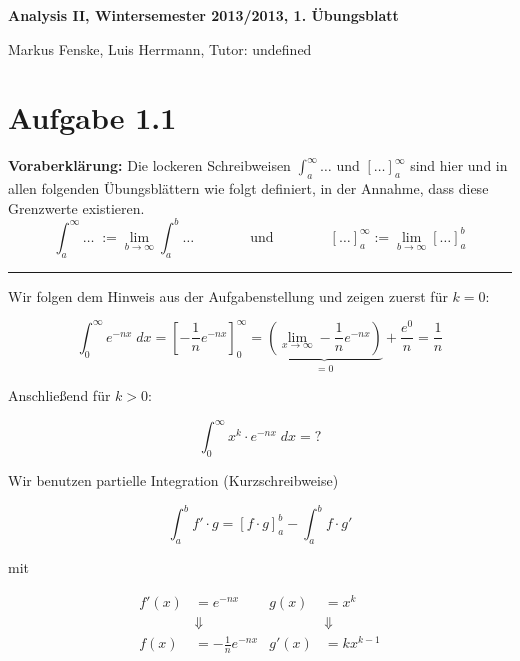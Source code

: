 \documentclass[a4paper,german,12pt,smallheadings]{scrartcl}
\begin{document}
\begin{center}
\bfseries %
\sffamily %
\vspace{-40pt}
Analysis II, Wintersemester 2013/2013, 1. Übungsblatt

Markus Fenske, Luis Herrmann, Tutor: undefined
\vspace{-10pt}
\end{center}

\section*{Aufgabe 1.1}

\textbf{Voraberklärung:} Die lockeren Schreibweisen $\int_{a}^{\infty} \dots$ und
$\left[\dots\right]_a^\infty$ sind hier und in allen folgenden Übungsblättern
wie folgt definiert, in der Annahme, dass diese Grenzwerte existieren.
\begin{equation*}
  \int_{a}^{\infty} \dots \; := \lim\limits_{b \to \infty}\int_{a}^{b} \dots \qquad \qquad 
  \text{und}
  \qquad \qquad \left[\dots\right]_a^\infty := \lim\limits_{b \to \infty}\left[\dots\right]_a^b
\end{equation*}

\rule{\textwidth}{0.4pt}
\vspace{4mm}


Wir folgen dem Hinweis aus der Aufgabenstellung und zeigen zuerst für $k=0$:

\begin{equation*}
  \int_0^\infty e^{-nx} \; dx = \left[ -\frac{1}{n} e^{-nx} \right]_0^\infty = \underbrace{\left(\lim_{x \to \infty} - \frac{1}{n} e^{-nx} \right)}_{=0} + \frac{e^0}{n} = \frac{1}{n}
\end{equation*}

Anschließend für $k > 0$:

\begin{equation*}
  \int_0^\infty x^k \cdot e^{-nx} \; dx = \text{?}
\end{equation*}

Wir benutzen partielle Integration (Kurzschreibweise)

\begin{equation*}
  \int_a^b f' \cdot g = \left[f \cdot g\right]_a^b - \int_a^b f \cdot g'
\end{equation*}

mit

\begin{align*}
  f'(x) &= e^{-nx} & g(x) &= x^k \\
        &\Downarrow & &\Downarrow\\
  f(x) &= -\frac{1}{n} e^{-nx} & g'(x) &= kx^{k-1}
\end{align*}
\end{document}
